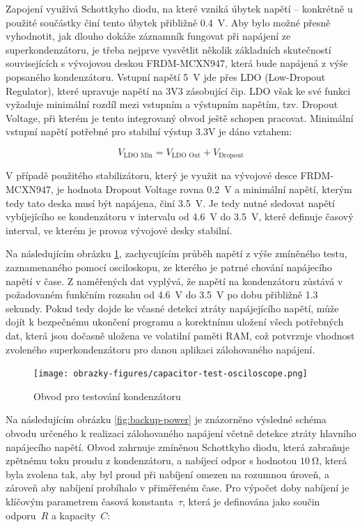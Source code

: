 Zapojení využívá Schottkyho diodu, na které vzniká úbytek napětí – konkrétně u použité součástky činí tento úbytek přibližně \SI{0.4}{\volt}. Aby bylo možné přesně vyhodnotit, jak dlouho dokáže záznamník fungovat při napájení ze superkondenzátoru, je třeba nejprve vysvětlit několik základních skutečností souvisejících s vývojovou deskou FRDM-MCXN947, která bude napájená z výše popsaného kondenzátoru. Vstupní napětí \SI{5}{\volt} jde přes LDO (Low-Dropout Regulator), které upravuje napětí na 3V3 zásobující čip. LDO však ke své funkci vyžaduje minimální rozdíl mezi vstupním a výstupním napětím, tzv. Dropout Voltage, při kterém je tento integrovaný obvod ještě schopen pracovat. Minimální vstupní napětí potřebné pro stabilní výstup 3.3V je dáno vztahem:

\[
V_{\text{LDO Min}} = V_{\text{LDO Out}} + V_{\text{Dropout}}
\]

V případě použitého stabilizátoru, který je využit na vývojové desce FRDM-MCXN947, je hodnota Dropout Voltage rovna \SI{0.2}{\volt} a minimální napětí, kterým tedy tato deska musí být napájena, činí \SI{3.5}{\volt}. Je tedy nutné sledovat napětí vybíjejícího se kondenzátoru v intervalu od \SI{4.6}{\volt} do \SI{3.5}{\volt}, které definuje časový interval, ve kterém je provoz vývojové desky stabilní.

Na následujícím obrázku \ref{fig:test-capacitors}, zachycujícím průběh napětí z výše zmíněného testu, zaznamenaného pomocí osciloskopu, ze kterého je patrné chování napájecího napětí v čase. Z naměřených dat vyplývá, že napětí na kondenzátoru zůstává v požadovaném funkčním rozsahu od \SI{4.6}{\volt} do \SI{3.5}{\volt} po dobu přibližně 1.3 sekundy. Pokud tedy dojde ke včasné detekci ztráty napájejícího napětí, může dojít k bezpečnému ukončení programu a korektnímu uložení všech potřebných dat, která jsou dočasně uložena ve volatilní paměti RAM, což potvrzuje vhodnost zvoleného superkondenzátoru pro danou aplikaci zálohovaného napájení.

\begin{figure}[h]
    \centering
    \texttt{[image: obrazky-figures/capacitor-test-osciloscope.png]}
    
    \caption{Obvod pro testování kondenzátoru}
    \label{fig:test-capacitors}
\end{figure}

Na následujícím obrázku \ref{fig:backup-power} je znázorněno výsledné schéma obvodu určeného k realizaci zálohovaného napájení včetně detekce ztráty hlavního napájecího napětí. Obvod zahrnuje zmíněnou Schottkyho diodu, která zabraňuje zpětnému toku proudu z kondenzátoru, a nabíjecí odpor s hodnotou $\SI{10}{\ohm}$, která byla zvolena tak, aby byl proud při nabíjení omezen na rozumnou úroveň, a zároveň aby nabíjení probíhalo v přiměřeném čase. Pro výpočet doby nabíjení je klíčovým parametrem časová konstanta~$\tau$, která je definována jako součin odporu~$R$ a kapacity~$C$:

